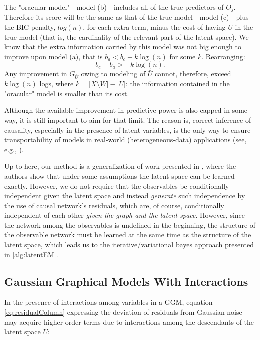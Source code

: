 \documentclass{article}
\begin{document}
The "oracular model" - model (b) - includes all of the true predictors of $O_j$.  Therefore its score will be the same as that of the true model - model (c) - plus the BIC penalty, $log(n)$, for each extra term, minus the cost of having $U$ in the true model (that is, the cardinality of the relevant part of the latent space).  We know that the extra information carried by this model was not big enough to improve upon model (a), that is $b_a < b_c + k \log(n)$ for some $k$.  Rearranging:
\begin{equation}
    b_c - b_a > -k\log(n).
    \label{eq:ceilingTheorem}
\end{equation}
Any improvement in $G_{\bar{U}}$ owing to modeling of $\bar{U}$ cannot, therefore, exceed $k\log(n)$ logs, where $k = |X \setminus W| - |U|$: the information contained in the "oracular" model is smaller than its cost.

Although the available improvement in predictive power is also capped in some way, it is still important to aim for that limit.  The reason is, correct inference of causality, especially in the presence of latent variables, is the only way to ensure transportability of models in real-world (heterogeneous-data) applications (see, e.g., \cite{bareinboim_causal_2016}).

Up to here, our method is a generalization of work presented in \cite{anandkumar_learning_2013}, where the authors show that under some assumptions the latent space can be learned exactly.  However, we do not require that the observables be conditionally independent given the latent space and instead \textit{generate} such independence by the use of causal network's residuals, which are, of course, conditionally independent of each other \textit{given the graph and the latent space}.  However, since the network among the observables is undefined in the beginning, the structure of the observable network must be learned at the same time as the structure of the latent space, which leads us to the iterative/variational bayes approach presented in \ref{alg:latentEM}.

\subsection{Gaussian Graphical Models With Interactions}
In the presence of interactions among variables in a GGM, equation \ref{eq:residualColumn} expressing the deviation of residuals from Gaussian noise may acquire higher-order terms due to interactions among the descendants of the latent space $U$:
\end{document}
